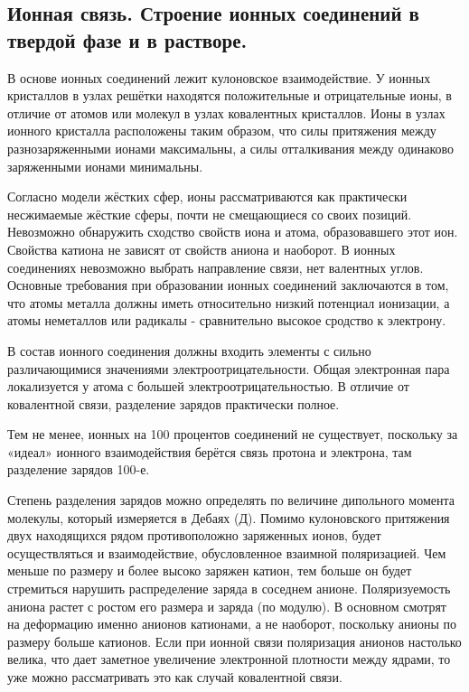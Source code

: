 \subsection{Ионная связь. Строение ионных соединений в твердой фазе и в растворе.}

В основе ионных соединений лежит кулоновское взаимодействие. У
ионных кристаллов в узлах решётки находятся положительные и
отрицательные ионы, в отличие от атомов или молекул в узлах
ковалентных кристаллов. Ионы в узлах ионного кристалла
расположены таким образом, что силы притяжения между
разнозаряженными ионами максимальны, а силы отталкивания
между одинаково заряженными ионами минимальны. 

Согласно модели жёстких сфер, ионы рассматриваются как практически
несжимаемые жёсткие сферы, почти не смещающиеся со своих
позиций. Невозможно обнаружить сходство свойств иона и атома,
образовавшего этот ион. Свойства катиона не зависят от свойств
аниона и наоборот. В ионных соединениях невозможно выбрать
направление связи, нет валентных углов. Основные требования при
образовании ионных соединений заключаются в том, что атомы
металла должны иметь относительно низкий потенциал
ионизации, а атомы неметаллов или радикалы - сравнительно
высокое сродство к электрону. 

В состав ионного соединения должны входить элементы с сильно различающимися
значениями электроотрицательности. Общая электронная пара
локализуется у атома с большей электроотрицательностью. В
отличие от ковалентной связи, разделение зарядов практически
полное. 

Тем не менее, ионных на 100 процентов соединений не существует,
поскольку за «идеал» ионного взаимодействия берётся связь
протона и электрона, там разделение зарядов 100-е. 

Степень разделения зарядов можно определять по величине
дипольного момента молекулы, который измеряется в Дебаях (Д).
Помимо кулоновского притяжения двух находящихся рядом
противоположно заряженных ионов, будет осуществляться и
взаимодействие, обусловленное взаимной поляризацией. Чем
меньше по размеру и более высоко заряжен катион, тем больше он
будет стремиться нарушить распределение заряда в соседнем
анионе. Поляризуемость аниона растет с ростом его размера и
заряда (по модулю). В основном смотрят на деформацию именно
анионов катионами, а не наоборот, поскольку анионы по размеру
больше катионов. Если при ионной связи поляризация анионов
настолько велика, что дает заметное увеличение электронной
плотности между ядрами, то уже можно рассматривать это как
случай ковалентной связи.

